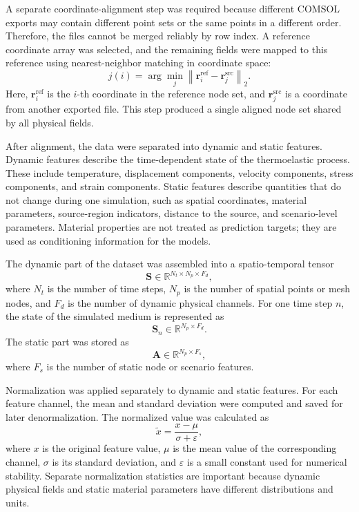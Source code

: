 A separate coordinate-alignment step was required because different COMSOL exports may contain different point sets or the same points in a different order. Therefore, the files cannot be merged reliably by row index. A reference coordinate array was selected, and the remaining fields were mapped to this reference using nearest-neighbor matching in coordinate space:
\begin{equation}
j(i)
=
\arg\min_j
\left\|
\mathbf{r}^{\mathrm{ref}}_i
-
\mathbf{r}^{\mathrm{src}}_j
\right\|_2 .
\end{equation}
Here, \(\mathbf{r}^{\mathrm{ref}}_i\) is the \(i\)-th coordinate in the reference node set, and \(\mathbf{r}^{\mathrm{src}}_j\) is a coordinate from another exported file. This step produced a single aligned node set shared by all physical fields.

After alignment, the data were separated into dynamic and static features. Dynamic features describe the time-dependent state of the thermoelastic process. These include temperature, displacement components, velocity components, stress components, and strain components. Static features describe quantities that do not change during one simulation, such as spatial coordinates, material parameters, source-region indicators, distance to the source, and scenario-level parameters. Material properties are not treated as prediction targets; they are used as conditioning information for the models.

The dynamic part of the dataset was assembled into a spatio-temporal tensor
\begin{equation}
\mathbf{S}
\in
\mathbb{R}^{N_t \times N_p \times F_d},
\end{equation}
where \(N_t\) is the number of time steps, \(N_p\) is the number of spatial points or mesh nodes, and \(F_d\) is the number of dynamic physical channels. For one time step \(n\), the state of the simulated medium is represented as
\begin{equation}
\mathbf{S}_n
\in
\mathbb{R}^{N_p \times F_d}.
\end{equation}
The static part was stored as
\begin{equation}
\mathbf{A}
\in
\mathbb{R}^{N_p \times F_s},
\end{equation}
where \(F_s\) is the number of static node or scenario features.

Normalization was applied separately to dynamic and static features. For each feature channel, the mean and standard deviation were computed and saved for later denormalization. The normalized value was calculated as
\begin{equation}
\widetilde{x}
=
\frac{x-\mu}{\sigma+\varepsilon},
\end{equation}
where \(x\) is the original feature value, \(\mu\) is the mean value of the corresponding channel, \(\sigma\) is its standard deviation, and \(\varepsilon\) is a small constant used for numerical stability. Separate normalization statistics are important because dynamic physical fields and static material parameters have different distributions and units.

